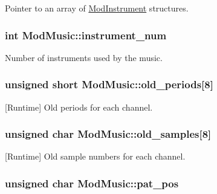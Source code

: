 Pointer to an array of \hyperlink{structModInstrument}{Mod\+Instrument} structures. 

\hypertarget{structModMusic_a56e199510a0f4107e0ddeb4d6f3cbd6e}{}
\subsubsection[{instrument\+\_\+num}]{\setlength{\rightskip}{0pt plus 5cm}int Mod\+Music\+::instrument\+\_\+num}\label{structModMusic_a56e199510a0f4107e0ddeb4d6f3cbd6e}


Number of instruments used by the music. 

\hypertarget{structModMusic_aaaa612da0b0920d51b87972c94e14ac0}{}
\subsubsection[{old\+\_\+periods}]{\setlength{\rightskip}{0pt plus 5cm}unsigned short Mod\+Music\+::old\+\_\+periods\mbox{[}8\mbox{]}}\label{structModMusic_aaaa612da0b0920d51b87972c94e14ac0}


\mbox{[}Runtime\mbox{]} Old periods for each channel. 

\hypertarget{structModMusic_a4a05f396814c9fd4cf163fad7ea0f852}{}
\subsubsection[{old\+\_\+samples}]{\setlength{\rightskip}{0pt plus 5cm}unsigned char Mod\+Music\+::old\+\_\+samples\mbox{[}8\mbox{]}}\label{structModMusic_a4a05f396814c9fd4cf163fad7ea0f852}


\mbox{[}Runtime\mbox{]} Old sample numbers for each channel. 

\hypertarget{structModMusic_a2dc34fe1aa5c7fd23be5f6dfbd47fa7d}{}
\subsubsection[{pat\+\_\+pos}]{\setlength{\rightskip}{0pt plus 5cm}unsigned char Mod\+Music\+::pat\+\_\+pos}\label{structModMusic_a2dc34fe1aa5c7fd23be5f6dfbd47fa7d}


